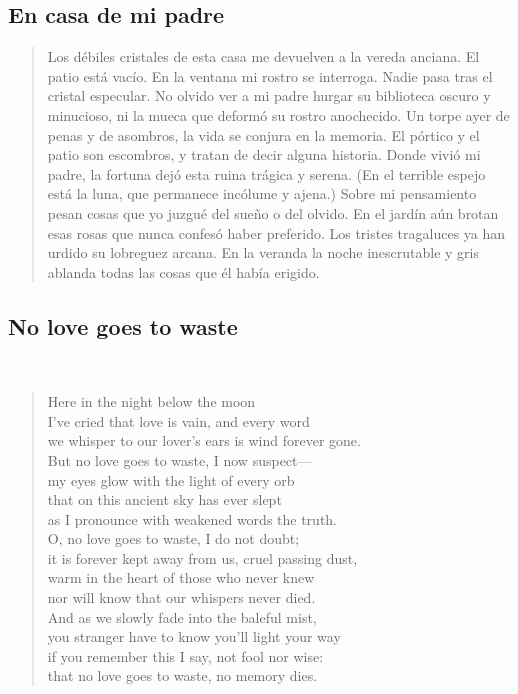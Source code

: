 \documentclass[a4paper, 12pt]{article}
\begin{document}
\pagebreak
\subsection{En casa de mi padre}

\begin{verse}
   Los débiles cristales de esta casa 
   me devuelven a la vereda anciana.
   El patio está vacío. En la ventana 
   mi rostro se interroga. Nadie pasa 
   tras el cristal especular. No olvido 
   ver a mi padre hurgar su biblioteca
   oscuro y minucioso, ni la mueca 
   que deformó su rostro anochecido.
   Un torpe ayer de penas y de asombros,
   la vida se conjura en la memoria.
   El pórtico y el patio son escombros,
   y tratan de decir alguna historia.
   Donde vivió mi padre, la fortuna 
   dejó esta ruina trágica y serena.
   (En el terrible espejo está la luna,
   que permanece incólume y ajena.)
   Sobre mi pensamiento pesan cosas 
   que yo juzgué del sueño o del olvido.
   En el jardín aún brotan esas rosas 
   que nunca confesó haber preferido.
   Los tristes tragaluces ya han urdido
   su lobreguez arcana. En la veranda 
   la noche inescrutable y gris ablanda 
   todas las cosas que él había erigido.
\end{verse}


\pagebreak
\subsection{No love goes to waste}
~ 

\begin{verse}
    
Here in the night below the moon\\
I’ve cried that love is vain, and every word\\
we whisper to our lover’s ears is wind forever gone.\\
But no love goes to waste, I now suspect—\\
my eyes glow with the light of every orb\\
that on this ancient sky has ever slept\\
as I pronounce with weakened words the truth.\\
O, no love goes to waste, I do not doubt;\\
it is forever kept away from us, cruel passing dust,\\
warm in the heart of those who never knew\\
nor will know that our whispers never died.\\
And as we slowly fade into the baleful mist,\\
you stranger have to know you’ll light your way\\
if you remember this I say, not fool nor wise:\\
that no love goes to waste, no memory dies.\\
\end{verse}
\end{document}
